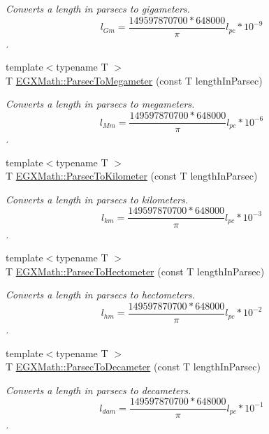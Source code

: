 \begin{DoxyCompactItemize}
\begin{DoxyCompactList}\small\item\em Converts a length in parsecs to gigameters. \[ l_{Gm}=\frac{149597870700 * 648000}{\pi}l_{pc} * 10^{-9} \]. \end{DoxyCompactList}\item 
{\footnotesize template$<$typename T $>$ }\\T \mbox{\hyperlink{group___e_g_x_math-_conversions-_length_conversions-_astronomical-_parsec-_s_i_ga2b7c62d851d25cb2041e3bc339110790}{E\+G\+X\+Math\+::\+Parsec\+To\+Megameter}} (const T length\+In\+Parsec)
\begin{DoxyCompactList}\small\item\em Converts a length in parsecs to megameters. \[ l_{Mm}=\frac{149597870700 * 648000}{\pi}l_{pc} * 10^{-6} \]. \end{DoxyCompactList}\item 
{\footnotesize template$<$typename T $>$ }\\T \mbox{\hyperlink{group___e_g_x_math-_conversions-_length_conversions-_astronomical-_parsec-_s_i_gae7136d7d0b81221c5c71de565648fb93}{E\+G\+X\+Math\+::\+Parsec\+To\+Kilometer}} (const T length\+In\+Parsec)
\begin{DoxyCompactList}\small\item\em Converts a length in parsecs to kilometers. \[ l_{km}=\frac{149597870700 * 648000}{\pi}l_{pc} * 10^{-3} \]. \end{DoxyCompactList}\item 
{\footnotesize template$<$typename T $>$ }\\T \mbox{\hyperlink{group___e_g_x_math-_conversions-_length_conversions-_astronomical-_parsec-_s_i_ga8abf21ebe80987ba6668d54e90d46129}{E\+G\+X\+Math\+::\+Parsec\+To\+Hectometer}} (const T length\+In\+Parsec)
\begin{DoxyCompactList}\small\item\em Converts a length in parsecs to hectometers. \[ l_{hm}=\frac{149597870700 * 648000}{\pi}l_{pc} * 10^{-2} \]. \end{DoxyCompactList}\item 
{\footnotesize template$<$typename T $>$ }\\T \mbox{\hyperlink{group___e_g_x_math-_conversions-_length_conversions-_astronomical-_parsec-_s_i_ga69437b0eb33c7cd5df74e32993f9b1e0}{E\+G\+X\+Math\+::\+Parsec\+To\+Decameter}} (const T length\+In\+Parsec)
\begin{DoxyCompactList}\small\item\em Converts a length in parsecs to decameters. \[ l_{dam}=\frac{149597870700 * 648000}{\pi}l_{pc} * 10^{-1} \]. \end{DoxyCompactList}\item 

\end{DoxyCompactItemize}
